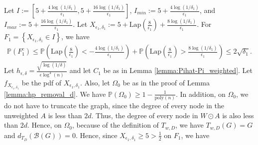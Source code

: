 \documentclass{article}
\begin{document}
Let $I := \left[5 + \frac{4\log(1/\delta_1)}{\epsilon_1}, 5 + \frac{16\log(1/\delta_1)}{\epsilon_1}\right]$, $I_{min} := 5 + \frac{4\log(1/\delta_1)}{\epsilon_1}$, and $I_{max} := 5 + \frac{16\log(1/\delta_1)}{\epsilon_1}$. Let $X_{\epsilon_1, \delta_1} := 5 + \mathrm{Lap}\left(\frac{8}{\epsilon_1}\right) + \frac{8\log(1/\delta_1)}{\epsilon_1}$. For $F_1 = \left\{X_{\epsilon_1, \delta_1} \in I\right\}$, we have
\begin{align*}
 \mathbb{P}\left(F_1^c\right) \leq \mathbb{P}\left(\mathrm{Lap}\left(\frac{8}{\epsilon_1}\right) < -\frac{4\log(1/\delta_1)}{\epsilon_1}\right) + \mathbb{P}\left(\mathrm{Lap}\left(\frac{8}{\epsilon_1}\right) > \frac{8\log(1/\delta_1)}{\epsilon_1}\right) \leq 2\sqrt{\delta_1}.
\end{align*}
Let $h_{\epsilon, \delta} = \frac{\sqrt{\log(1/\delta)}}{\epsilon\log^4(n)}$ and let $C_1$ be as in Lemma \ref{lemma:Pihat-Pi_weighted}. Let $f_{X_{\epsilon_1, \delta_1}}$ be the pdf of $X_{\epsilon_1, \delta_1}$. Also, let $\Omega_0$ be as in the proof of Lemma \ref{lemma:hp_removal_d}. We have $\mathbb{P}(\Omega_0) \geq 1 - \frac{1}{\mathrm{poly}(n)}$. In addition, on $\Omega_0$, we do not have to truncate the graph, since the degree of every node in the unweighted $A$ is less than $2d$. Thus, the degree of every node in $W\odot A$ is also less than $2d$. Hence, on $\Omega_0$, because of the definition of $T_{w, D}$, we have $T_{w,D}(G) = G$ and $d_{T_{D}}(\mathcal{B}(G)) = 0$. Hence, since $X_{\epsilon_1, \delta_1} \geq 5 > \frac{1}{2}$ on $F_1$, we have
\end{document}
